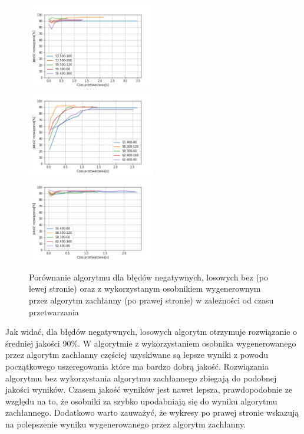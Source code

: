 \documentclass{article}
\begin{document}
\begin{figure}[H]
\includegraphics[width=0.5\textwidth]{Czasneg-los-greedy3.png}
\includegraphics[width=0.5\textwidth]{Czasneg-los4.png}
\includegraphics[width=0.5\textwidth]{Czasneg-los-greedy4.png}
\caption{Porównanie algorytmu dla błędów negatywnych, losowych bez (po lewej stronie) oraz z wykorzystanym osobnikiem wygenerownym przez algorytm zachłanny (po prawej stronie) w zależności od czasu przetwarzania}
\end{figure}
Jak widać, dla błędów negatywnych, losowych algorytm otrzymuje rozwiązanie o średniej jakości 90\%. W algorytmie z wykorzystaniem osobnika wygenerowanego przez algorytm zachłanny częściej uzyskiwane są lepsze wyniki z powodu początkowego uszeregowania które ma bardzo dobrą jakość. Rozwiązania algorytmu bez wykorzystania algorytmu zachłannego zbiegają do podobnej jakości wyników. Czasem jakość wyników jest nawet lepsza, prawdopodobnie ze względu na to, że osobniki za szybko upodabniają się do wyniku algorytmu zachłannego. Dodatkowo warto zauważyć, że wykresy po prawej stronie wskazują na polepszenie wyniku wygenerowanego przez algorytm zachłanny.
\end{document}
